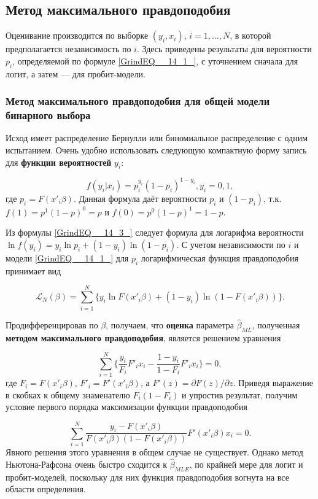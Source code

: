 \subsection{Метод максимального правдоподобия}

Оценивание производится по выборке $(y_i,  x_i)$, $i=1, \ldots,  N$,  в которой предполагается независимость по $i$. Здесь приведены результаты для вероятности $p_i$,  определяемой по формуле \eqref{GrindEQ__14_1_},  с уточнением сначала для логит, а затем --- для пробит-модели.

\subsubsection*{Метод максимального правдоподобия для общей модели бинарного выбора}

Исход имеет распределение Бернулли или биномиальное распределение с одним испытанием. Очень удобно использовать следующую  компактную форму  запись для \textbf{функции вероятностей}  $y_i$:

\begin{equation} 
\label{GrindEQ__14_3_}
 f(y_i|x_i)=p^{y_i}_i(1-p_i)^{1-y_i}, y_i=0, 1,  
\end{equation} 
где $p_i=F(x'_i\beta )$. Данная формула даёт вероятности $p_i$ и $(1-p_i)$,  т.к.  $f(1)=p^1(1-p)^0=p$ и $f(0)=p^0(1-p)^1=1-p$.

Из формулы \eqref{GrindEQ__14_3_} следует формула для логарифма вероятности $\ln f(y_i)=y_i \ln p_i +(1-y_i) \ln (1-p_i)$. С учетом независимости по $i$ и модели \eqref{GrindEQ__14_1_} для $p_i$ логарифмическая функция правдоподобия принимает вид

\begin{equation} 
\label{GrindEQ__14_4_}
 \mathcal{L}_N (\beta)=\sum^N_{i=1} \{ y_i \ln F(x'_i\beta)+ (1-y_i) \ln (1-F(x'_i\beta)) \}.
 \end{equation} 

Продифференцировав по $\beta$,  получаем,  что \textbf{оценка} параметра $\widehat\beta_{ML}$,  полученная \textbf{методом максимального правдоподобия}, является решением уравнения

\[
\sum^N_{i=1} \{ \frac{y_i}{F_i} F'_i x_i - \frac{1-y_i}{1-F_i} F'_ix_i \} =0, 
\] 
где $F_i=F(x'_i\beta)$, $F'_i=F'(x'_i\beta)$,  а $F'(z)=\partial F(z)/\partial z$. Приведя выражение в скобках к общему знаменателю $F_i(1-F_i)$ и упростив результат, получим условие первого порядка максимизации функции правдоподобия

\begin{equation} 
\label{GrindEQ__14_5_} 
\sum^N_{i=1} \frac{y_i-F(x'_i\beta)}{F(x'_i\beta)(1-F(x'_i\beta))}F'(x'_i\beta)x_i=0. 
\end{equation} 
Явного решения этого уравнения в общем случае не существует.  Однако метод Ньютона-Рафсона очень быстро сходится к $\widehat\beta_{MLE}$, по крайней мере для логит и пробит-моделей,  поскольку для них функция правдоподобия вогнута на все области определения.


